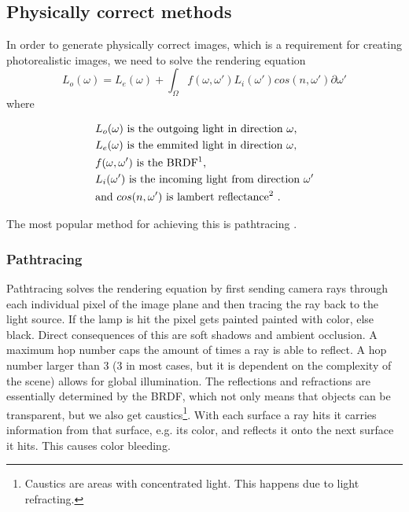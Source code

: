 \documentclass{ACGSeminar}
\begin{document}
	\subsection{Physically correct methods}
	In order to generate physically correct images, which is a requirement for creating photorealistic images, we need to solve the rendering equation
	$$ L_o(\omega) = L_e(\omega) + \int_\Omega f(\omega, \omega')L_i(\omega')cos(n, \omega') \partial \omega' $$
	where 
	\begin{center}
		\begin{align*}
			&L_o(\omega) \text{ is the outgoing light in direction } \omega\text{,}\\
			&L_e(\omega) \text{ is the emmited light in direction } \omega\text{,}\\
			&f(\omega, \omega') \text{ is the BRDF\footnotemark} \text{,}\\
			&L_i(\omega') \text{ is the incoming light from direction } \omega'\\
			&\text{and } cos(n, \omega') \text{ is lambert reflectance\footnotemark}  \text{ .}
		\end{align*}
	\end{center}
	\addtocounter{footnote}{-1}
	The most popular method for achieving this is pathtracing \cite{P2PATH}.
	\subsubsection{Pathtracing}
		Pathtracing solves the rendering equation by first sending camera rays through each individual pixel of the image plane and then tracing the ray back to the light source. If the lamp is hit the pixel gets painted painted with color, else black. Direct consequences of this are soft shadows and ambient occlusion. A maximum hop number caps the amount of times a ray is able to reflect. A hop number larger than 3 (3 in most cases, but it is dependent on the complexity of the scene) allows for global illumination. The reflections and refractions are essentially determined by the BRDF, which not only means that objects can be transparent, but we also get caustics\footnote{Caustics are areas with concentrated light. This happens due to light refracting.}. With each surface a ray hits it carries information from that surface, e.g. its color, and reflects it onto the next surface it hits. This causes color bleeding.
\end{document}
